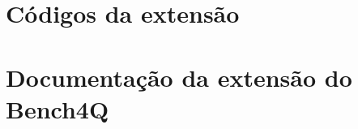 \documentclass[mestrado, pos-defesa, spanish, english, brazil]{packages/icmc}
\begin{document}
	
	
	\begin{apendicesenv}
		
		\chapter{Códigos da extensão}
		\label{chapter:codigo}
		
		\chapter{Documentação da extensão do Bench4Q}
		\label{chapter:documentacao}
		
		
		
	\end{apendicesenv}
	
	
	
	
	
	
\end{document}
